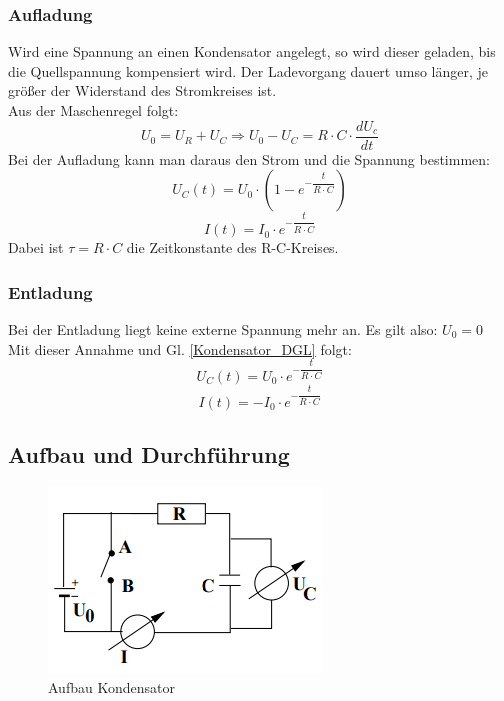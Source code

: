 \documentclass[12pt,a4paper]{article}
\begin{document}
\subsubsection{Aufladung}
Wird eine Spannung an einen Kondensator angelegt, so wird dieser geladen, bis die Quellspannung kompensiert wird. Der Ladevorgang dauert umso länger, je größer der Widerstand des Stromkreises ist.\\
Aus der Maschenregel folgt:
\begin{equation}
U_0 = U_R + U_C \Rightarrow U_0 - U_C = R\cdot C\cdot \dfrac{dU_c}{dt}
\label{Kondensator_DGL}
\end{equation}
Bei der Aufladung kann man daraus den Strom und die Spannung bestimmen:
\begin{equation}
U_C(t) = U_0 \cdot (1-e^{-\dfrac{t}{R\cdot C}})
\end{equation}
\begin{equation}
I(t) = I_0 \cdot e^{-\dfrac{t}{R\cdot C}}
\end{equation}
Dabei ist $\tau = R \cdot C$ die Zeitkonstante des R-C-Kreises.
\subsubsection{Entladung}
Bei der Entladung liegt keine externe Spannung mehr an. Es gilt also: $U_0 = 0$\\
Mit dieser Annahme und Gl. \ref{Kondensator_DGL} folgt:
\begin{equation}
U_C(t) = U_0 \cdot e^{-\dfrac{t}{R\cdot C}}
\end{equation}
\begin{equation}
I(t) = -I_0 \cdot e^{-\dfrac{t}{R\cdot C}}
\end{equation}
\subsection{Aufbau und Durchführung}
\begin{figure}[H]
\begin{center}
\includegraphics[width=0.75\linewidth]{Bilder/Kondensator_Aufbau}
\caption[Aufbau Kondensator]{Aufbau Kondensator}
\label{fig:Kond_Aufbau}
\end{center}
\end{figure}
\end{document}
